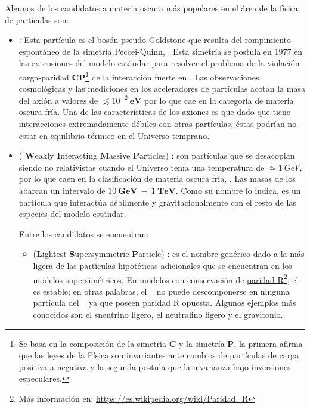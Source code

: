 Algunos de los candidatos a materia oscura más populares en el área de la física de partículas son: 

\begin{itemize}
\item \textbf{\Axiones}%
: Esta partícula es el bosón pseudo-Goldstone que resulta del rompimiento espontáneo de la simetría Peccei-Quinn, \citep{axion_2019}. Esta simetría se postula en 1977 en las extensiones del modelo estándar para resolver el problema de la violación carga-paridad \textbf{CP}\footnote{Se basa en la composición de la simetría \textbf{C} y la simetría \textbf{P}, la primera afirma que las leyes de la Física son invariantes  ante cambios de partículas de carga positiva a negativa y la segunda postula que la invarianza bajo inversiones especulares. } de la interacción fuerte en \QCD. Las observaciones cosmológicas y las mediciones en los aceleradores de partículas acotan la masa del axión a valores de $\lesssim 10^{-2}~\mathbf{eV}$ por lo que cae en la categoría de materia oscura fría. Una de las características de los axiones es que dado que tiene interacciones extremadamente débiles con otras partículas, éstas podrían no estar en equilibrio térmico en el Universo temprano. 

\item \WIMPs ( \textbf{W}eakly \textbf{I}nteracting \textbf{M}assive \textbf{P}articles) %
: son partículas que se desacoplan siendo no relativistas cuando el Universo tenía una temperatura de $\simeq 1~ GeV$, por lo que caen en la clasificación de materia oscura fría, \citep{wimps_2018}. Las masas
de los \WIMPs ~ abarcan un intervalo de $10 ~ \mathbf{GeV} ~ - ~ 1 ~ \mathbf{TeV}$. Como su nombre lo indica, es un partícula que interactúa débilmente y gravitacionalmente con el resto de las especies del modelo estándar. 



Entre los candidatos se encuentran:
\begin{itemize}
\item 	\LSP (\textbf{L}ightest \textbf{S}upersymmetric \textbf{P}article)%
: es el nombre genérico dado a la más ligera de las partículas hipotéticas adicionales que se encuentran en los modelos supersimétricos. En modelos con conservación de \href{https://es.wikipedia.org/wiki/Paridad\_R}{paridad R}\footnote{{Más información en: \href{https://es.wikipedia.org/wiki/Paridad\_R}{https://es.wikipedia.org/wiki/Paridad\_R}}}, el \LSP ~ es estable; en otras palabras, el \LSP ~ no puede descomponerse en ninguna partícula del \ME~ ya que poseen paridad R opuesta. Algunos ejemplos más conocidos son el sneutrino ligero, el neutralino ligero y el gravitonio.


\end{itemize}
\end{itemize}
